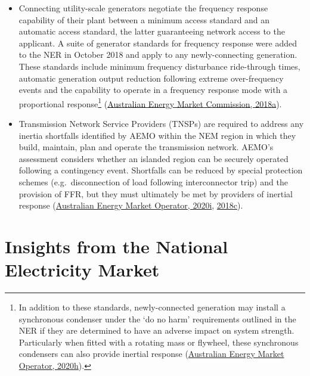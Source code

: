 \documentclass[12pt,a4paper,]{report}
\begin{document}
\begin{itemize}
\item
  Connecting utility-scale generators negotiate the frequency response
  capability of their plant between a minimum access standard and an
  automatic access standard, the latter guaranteeing network access to
  the applicant. A suite of generator standards for frequency response
  were added to the NER in October 2018 and apply to any
  newly-connecting generation. These standards include minimum frequency
  disturbance ride-through times, automatic generation output reduction
  following extreme over-frequency events and the capability to operate
  in a frequency response mode with a proportional response\footnote{In
    addition to these standards, newly-connected generation may install
    a synchronous condenser under the `do no harm' requirements outlined
    in the NER if they are determined to have an adverse impact on
    system strength. Particularly when fitted with a rotating mass or
    flywheel, these synchronous condensers can also provide inertial
    response
    (\protect\hyperlink{ref-australianenergymarketoperatorSystemStrengthNEM2020}{Australian
    Energy Market Operator, 2020h}).}
  (\protect\hyperlink{ref-australianenergymarketcommissionGeneratorTechnicalPerformance2018}{Australian
  Energy Market Commission, 2018a}).
\item
  Transmission Network Service Providers (TNSPs) are required to address
  any inertia shortfalls identified by AEMO within the NEM region in
  which they build, maintain, plan and operate the transmission network.
  AEMO's assessment considers whether an islanded region can be securely
  operated following a contingency event. Shortfalls can be reduced by
  special protection schemes (e.g.~disconnection of load following
  interconnector trip) and the provision of FFR, but they must
  ultimately be met by providers of inertial response
  (\protect\hyperlink{ref-australianenergymarketoperatorNoticeSouthAustralia2020}{Australian
  Energy Market Operator, 2020i},
  \protect\hyperlink{ref-australianenergymarketoperatorInertiaRequirementsMethodology2018}{2018c}).
\end{itemize}

\hypertarget{sec:fcs-insights}{%
\section{Insights from the National Electricity
Market}\label{sec:fcs-insights}}
\end{document}
